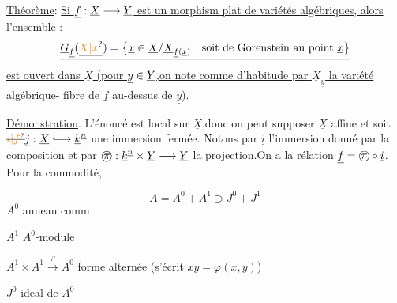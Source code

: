 \uline{Théorème}: \uline{Si $\underline f:\underline X\longrightarrow\underline Y$ est un morphism plat de variétés algébriques, alors l'ensemble} :
\[
\underline{\underline G_{\handwritten{\underline f}}(\handwritten{\underline{\unsure{X|x}}})=\handwritten{\bigl\{}\handwritten{\underline x\in}\underline X/\underline X_{\handwritten{\underline f(\underline x)}}\quad\text{soit de Gorenstein au point }\handwritten{\underline x\bigr\}}}
\]
\uline{est ouvert dans $\underline X$ (pour $\underline y\in\underline Y$,on note comme d'habitude par $\underline X_{\underline y}$
la variété algébrique- fibre de $\underline f$\deleted{\unsure{,}} au-dessus de $\underline y$)}.

\uline{Démonstration}. L'énoncé est local sur $\underline X$,donc on peut
supposer $\underline X$ affine et soit $\deleted{\unsure{i|f}}\handwritten{\underline j}:\underline X\handwritten{\lhook\joinrel\longrightarrow}\handwritten{\underline k}^{\underline n}$ une immersion fermée.
Notons par $\underline i$ l'immersion donné par la composition
et par $\text{\textcircled{$\pi$}}:\underline k^{\underline n}\times\underline Y\longrightarrow\underline Y$ la projection.On a la rélation $\underline f=\text{\textcircled{$\pi$}}\circ\underline i$. Pour la commodité,

\[
A=A^0+A^1\supset J^0+J^1
\]
$A^0$ anneau comm

$A^1$ \quad $A^0$-module

$A^1\times A^1\xrightarrow{\varphi}A^0$ forme alternée (s'écrit $xy=\varphi(x,y)$)

$J^0$ ideal de $A^0$

